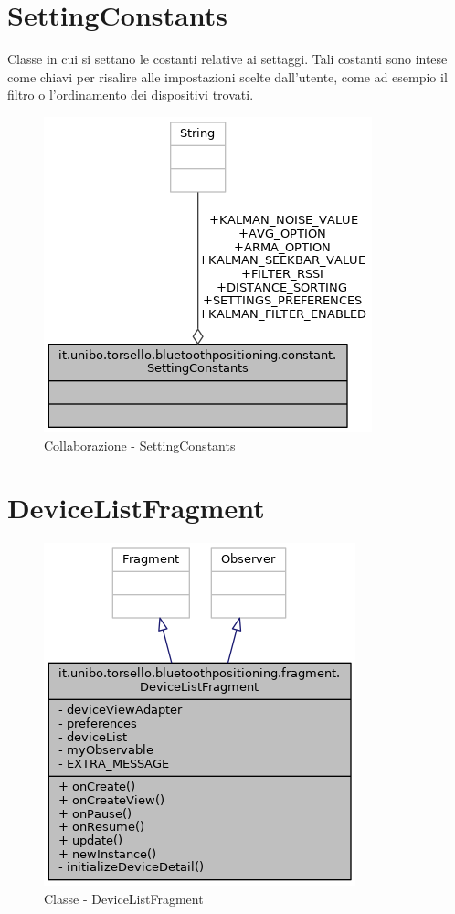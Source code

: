 \newpage
\section{SettingConstants}

Classe in cui si settano le costanti relative ai settaggi. Tali costanti sono intese come chiavi per risalire alle impostazioni scelte dall'utente, come ad esempio il filtro o l'ordinamento dei dispositivi trovati.
\begin{figure}[ph]
	\centering
	\includegraphics[width=0.5\linewidth]{img/uml/class/classit_1_1unibo_1_1torsello_1_1bluetoothpositioning_1_1constant_1_1SettingConstants__coll__graph.png}
	\caption{Collaborazione - SettingConstants}
\end{figure}

\newpage
\section{DeviceListFragment}\label{ch:device_list}
\begin{figure}[ph]
	\centering
	\includegraphics[width=0.5\linewidth]{img/uml/class/classit_1_1unibo_1_1torsello_1_1bluetoothpositioning_1_1fragment_1_1DeviceListFragment__inherit__graph.png}
	\caption{Classe - DeviceListFragment}
\end{figure}

